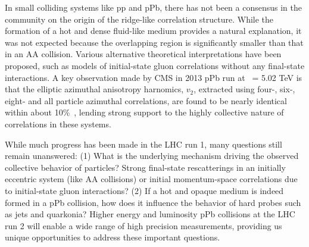 In small colliding systems like pp and pPb, there has not been a consensus 
in the community on the origin of the ridge-like correlation structure. 
While the formation of a hot and dense fluid-like medium provides a natural explanation, 
it was not expected because the overlapping region is significantly smaller than 
that in an AA collision. Various alternative theoretical interpretations have been 
proposed, such as models of initial-state gluon correlations without any final-state interactions.
A key observation made by CMS in 2013 pPb run at \rootsNN\ = 5.02 TeV is that
the elliptic azimuthal anisotropy harnomics, $v_2$, extracted using four-, six-,
eight- and all particle azimuthal correlations, are found to be nearly identical
within about 10\%~\cite{Khachatryan:2015waa}, lending strong support to the highly 
collective nature of correlations in these systems. 

While much progress has been made in the LHC run 1, many questions still remain unanswered:
(1) What is the underlying mechanism driving the observed collective behavior of particles? 
Strong final-state rescatterings in an initially eccentric system (like AA collisions) or 
initial momentum-space correlations due to initial-state gluon interactions? (2) If a hot and opaque 
medium is indeed formed in a pPb collision, how does it influence the behavior of hard probes
such as jets and quarkonia? Higher energy and luminosity pPb collisions at the LHC run 2 
will enable a wide range of high precision measurements, providing us unique opportunities 
to address these important questions. 